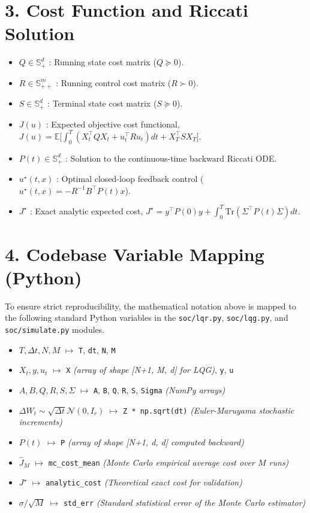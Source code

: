 \documentclass[12pt, a4paper]{article}
\begin{document}
\section*{3. Cost Function and Riccati Solution}
\begin{itemize}
    \item $Q \in \mathbb{S}^d_+$ : Running state cost matrix ($Q \succeq 0$).
    \item $R \in \mathbb{S}^m_{++}$ : Running control cost matrix ($R \succ 0$).
    \item $S \in \mathbb{S}^d_+$ : Terminal state cost matrix ($S \succeq 0$).
    \item $J(u)$ : Expected objective cost functional, $J(u) = \mathbb{E}\Big[ \int_0^T (X_t^\top Q X_t + u_t^\top R u_t) dt + X_T^\top S X_T \Big]$.
    \item $P(t) \in \mathbb{S}^d_+$ : Solution to the continuous-time backward Riccati ODE.
    \item $u^\star(t, x)$ : Optimal closed-loop feedback control ($u^\star(t, x) = -R^{-1}B^\top P(t)x$).
    \item $J^\star$ : Exact analytic expected cost, $J^\star = y^\top P(0) y + \int_0^T \text{Tr}(\Sigma^\top P(t) \Sigma) dt$.
\end{itemize}

\vspace{0.5cm}

\section*{4. Codebase Variable Mapping (Python)}
To ensure strict reproducibility, the mathematical notation above is mapped to the following standard Python variables in the \texttt{soc/lqr.py}, \texttt{soc/lqg.py}, and \texttt{soc/simulate.py} modules.

\begin{itemize}
    \item $T, \Delta t, N, M$ $\mapsto$ \texttt{T}, \texttt{dt}, \texttt{N}, \texttt{M}
    \item $X_t, y, u_t$ $\mapsto$ \texttt{X} \textit{(array of shape [N+1, M, d] for LQG)}, \texttt{y}, \texttt{u}
    \item $A, B, Q, R, S, \Sigma$ $\mapsto$ \texttt{A}, \texttt{B}, \texttt{Q}, \texttt{R}, \texttt{S}, \texttt{Sigma} \textit{(NumPy arrays)}
    \item $\Delta W_t \sim \sqrt{\Delta t} \mathcal{N}(0, I_r)$ $\mapsto$ \texttt{Z * np.sqrt(dt)} \textit{(Euler-Maruyama stochastic increments)}
    \item $P(t)$ $\mapsto$ \texttt{P} \textit{(array of shape [N+1, d, d] computed backward)}
    \item $\hat{J}_M$ $\mapsto$ \texttt{mc\_cost\_mean} \textit{(Monte Carlo empirical average cost over $M$ runs)}
    \item $J^\star$ $\mapsto$ \texttt{analytic\_cost} \textit{(Theoretical exact cost for validation)}
    \item $\sigma / \sqrt{M}$ $\mapsto$ \texttt{std\_err} \textit{(Standard statistical error of the Monte Carlo estimator)}
\end{itemize}
\end{document}
